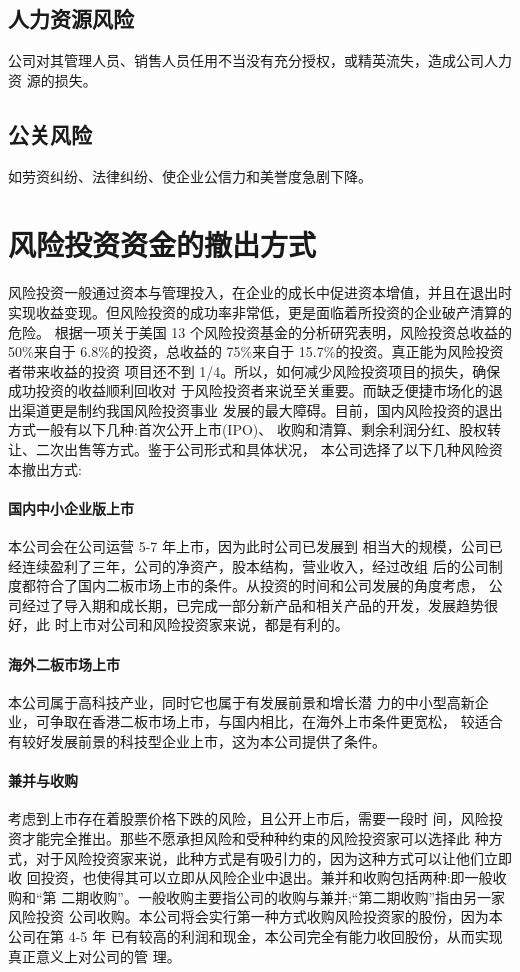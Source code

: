 \subsection{人力资源风险}
公司对其管理人员、销售人员任用不当没有充分授权，或精英流失，造成公司人力资
源的损失。
\subsection{公关风险}
如劳资纠纷、法律纠纷、使企业公信力和美誉度急剧下降。

\section{风险投资资金的撤出方式}
风险投资一般通过资本与管理投入，在企业的成长中促进资本增值，并且在退出时
实现收益变现。但风险投资的成功率非常低，更是面临着所投资的企业破产清算的危险。
根据一项关于美国 13 个风险投资基金的分析研究表明，风险投资总收益的 50\%来自于
6.8\%的投资，总收益的 75\%来自于 15.7\%的投资。真正能为风险投资者带来收益的投资
项目还不到 1/4。所以，如何减少风险投资项目的损失，确保成功投资的收益顺利回收对
于风险投资者来说至关重要。而缺乏便捷市场化的退出渠道更是制约我国风险投资事业
发展的最大障碍。目前，国内风险投资的退出方式一般有以下几种:首次公开上市(IPO)、
收购和清算、剩余利润分红、股权转让、二次出售等方式。鉴于公司形式和具体状况，
本公司选择了以下几种风险资本撤出方式:

\paragraph{国内中小企业版上市}
本公司会在公司运营 5-7 年上市，因为此时公司已发展到
相当大的规模，公司已经连续盈利了三年，公司的净资产，股本结构，营业收入，经过改组
后的公司制度都符合了国内二板市场上市的条件。从投资的时间和公司发展的角度考虑，
公司经过了导入期和成长期，已完成一部分新产品和相关产品的开发，发展趋势很好，此
时上市对公司和风险投资家来说，都是有利的。

\paragraph{海外二板市场上市}
本公司属于高科技产业，同时它也属于有发展前景和增长潜
力的中小型高新企业，可争取在香港二板市场上市，与国内相比，在海外上市条件更宽松，
较适合有较好发展前景的科技型企业上市，这为本公司提供了条件。

\paragraph{兼并与收购}
考虑到上市存在着股票价格下跌的风险，且公开上市后，需要一段时
间，风险投资才能完全推出。那些不愿承担风险和受种种约束的风险投资家可以选择此
种方式，对于风险投资家来说，此种方式是有吸引力的，因为这种方式可以让他们立即收
回投资，也使得其可以立即从风险企业中退出。兼并和收购包括两种:即一般收购和“第
二期收购”。一般收购主要指公司的收购与兼并;“第二期收购”指由另一家风险投资
公司收购。本公司将会实行第一种方式收购风险投资家的股份，因为本公司在第 4-5 年
已有较高的利润和现金，本公司完全有能力收回股份，从而实现真正意义上对公司的管
理。

